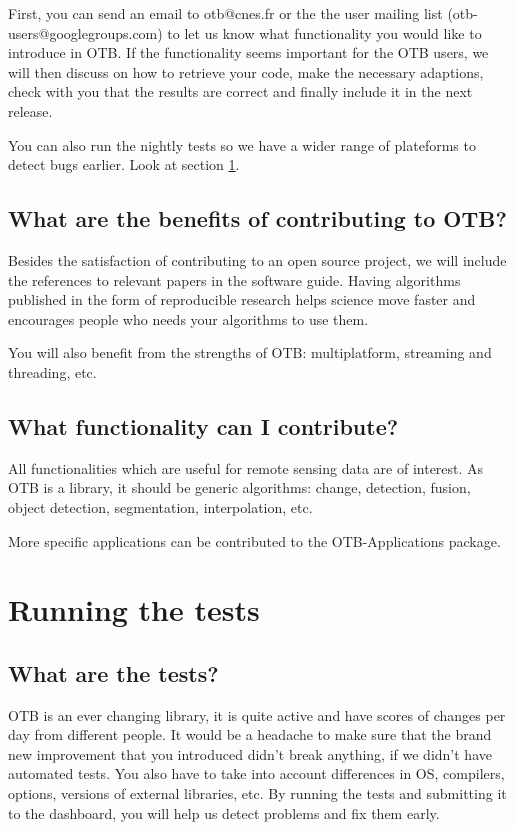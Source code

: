 First, you can send an email to otb@cnes.fr or the the user mailing list (otb-users@googlegroups.com) 
to let us know what functionality
you would like to introduce in OTB. If the functionality seems important for the
OTB users, we will then discuss on how to retrieve your code,
make the necessary adaptions, check with you that the results are correct and finally
include it in the next release.

You can also run the nightly tests so we have a wider range of plateforms to detect
bugs earlier. Look at section \ref{sec:runningTheTests}.

\subsection{What are the benefits of contributing to OTB?}

Besides the satisfaction of contributing to an open source project, we will include
the references to relevant papers in the software guide. Having algorithms
published in the form of reproducible research helps science move faster and
encourages people who needs your algorithms to use them.

You will also benefit from the strengths of OTB: multiplatform, streaming and
threading, etc.

\subsection{What functionality can I contribute?}

All functionalities which are useful for remote sensing data are of interest. As
OTB is a library, it should be generic algorithms: change, detection, fusion,
object detection, segmentation, interpolation, etc.

More specific applications can be contributed to the OTB-Applications package.

\section{Running the tests}\label{sec:runningTheTests}

\subsection{What are the tests?}

OTB is an ever changing library, it is quite active and have scores of
changes per day from different people. It would be a headache to make
sure that the brand new improvement that you introduced didn't break
anything, if we didn't have automated tests. You also have to take into
account differences in OS, compilers, options, versions of external
libraries, etc. By running the tests and submitting it to the dashboard,
you will help us detect problems and fix them early.

